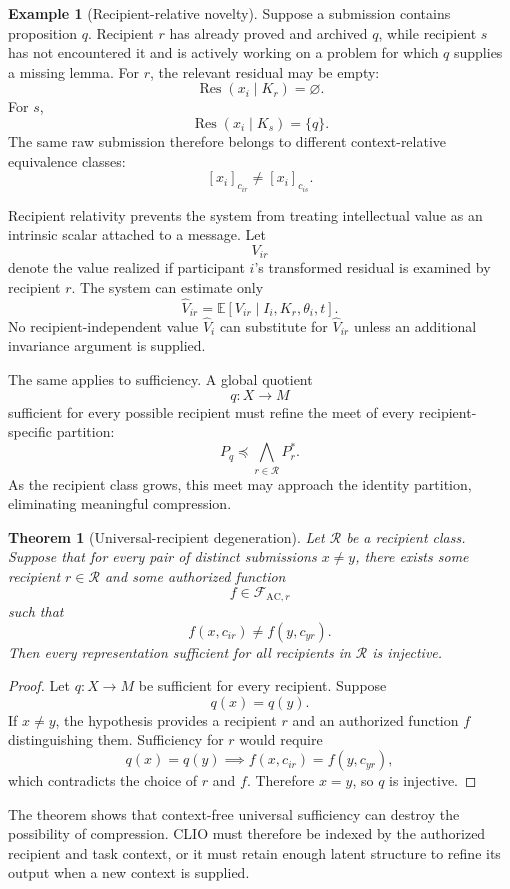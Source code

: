\documentclass[11pt]{article}
\newtheorem{theorem}[definition]{Theorem}
\theoremstyle{definition}
\newtheorem{example}[definition]{Example}
\DeclareMathOperator{\Res}{Res}
\newcommand{\E}{\mathbb{E}}
\newcommand{\F}{\mathcal{F}}
\begin{document}
\begin{example}[Recipient-relative novelty]
Suppose a submission contains proposition \(q\). Recipient \(r\) has already proved and archived \(q\), while recipient \(s\) has not encountered it and is actively working on a problem for which \(q\) supplies a missing lemma. For \(r\), the relevant residual may be empty:
\[
\Res(x_i\mid K_r)=\varnothing.
\]
For \(s\),
\[
\Res(x_i\mid K_s)=\{q\}.
\]
The same raw submission therefore belongs to different context-relative equivalence classes:
\[
[x_i]_{c_{ir}}
\neq
[x_i]_{c_{is}}.
\]
\end{example}

Recipient relativity prevents the system from treating intellectual value as an intrinsic scalar attached to a message. Let
\[
V_{ir}
\]
denote the value realized if participant \(i\)'s transformed residual is examined by recipient \(r\). The system can estimate only
\[
\widehat V_{ir}
=
\E[V_{ir}\mid I_i,K_r,\theta_i,t].
\]
No recipient-independent value \(\widehat V_i\) can substitute for \(\widehat V_{ir}\) unless an additional invariance argument is supplied.

The same applies to sufficiency. A global quotient
\[
q:X\to M
\]
sufficient for every possible recipient must refine the meet of every recipient-specific partition:
\[
P_q
\preceq
\bigwedge_{r\in\mathcal R}
P_r^{*}.
\]
As the recipient class grows, this meet may approach the identity partition, eliminating meaningful compression.

\begin{theorem}[Universal-recipient degeneration]
Let \(\mathcal R\) be a recipient class. Suppose that for every pair of distinct submissions \(x\neq y\), there exists some recipient \(r\in\mathcal R\) and some authorized function
\[
f\in\F_{\mathrm{AC},r}
\]
such that
\[
f(x,c_{ir})\neq f(y,c_{yr}).
\]
Then every representation sufficient for all recipients in \(\mathcal R\) is injective.
\end{theorem}

\begin{proof}
Let \(q:X\to M\) be sufficient for every recipient. Suppose
\[
q(x)=q(y).
\]
If \(x\neq y\), the hypothesis provides a recipient \(r\) and an authorized function \(f\) distinguishing them. Sufficiency for \(r\) would require
\[
q(x)=q(y)
\implies
f(x,c_{ir})=f(y,c_{yr}),
\]
which contradicts the choice of \(r\) and \(f\). Therefore \(x=y\), so \(q\) is injective.
\end{proof}

The theorem shows that context-free universal sufficiency can destroy the possibility of compression. CLIO must therefore be indexed by the authorized recipient and task context, or it must retain enough latent structure to refine its output when a new context is supplied.
\end{document}
